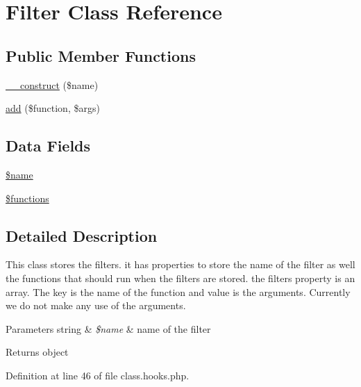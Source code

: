 \hypertarget{class_filter}{\section{Filter Class Reference}
\label{class_filter}
}
\subsection*{Public Member Functions}
\begin{DoxyCompactItemize}
\item 
\hyperlink{class_filter_a4717bbfc70a40a57ee741ed70766c309}{\-\_\-\-\_\-construct} (\$name)
\item 
\hyperlink{class_filter_a90cbfdb2d91157a1f2e94fcab3d220b3}{add} (\$function, \$args)
\end{DoxyCompactItemize}
\subsection*{Data Fields}
\begin{DoxyCompactItemize}
\item 
\hyperlink{class_filter_ab2fc40d43824ea3e1ce5d86dee0d763b}{\$name}
\item 
\hyperlink{class_filter_aa75daea491817f3b64daa2f51128bcdf}{\$functions}
\end{DoxyCompactItemize}


\subsection{Detailed Description}
This class stores the filters. it has properties to store the name of the filter as well the functions that should run when the filters are stored. the filters property is an array. The key is the name of the function and value is the arguments. Currently we do not make any use of the arguments.


\begin{DoxyParams}[1]{Parameters}
string & {\em \$name} & name of the filter \\
\hline
\end{DoxyParams}
\begin{DoxyReturn}{Returns}
object 
\end{DoxyReturn}


Definition at line 46 of file class.\-hooks.\-php.



